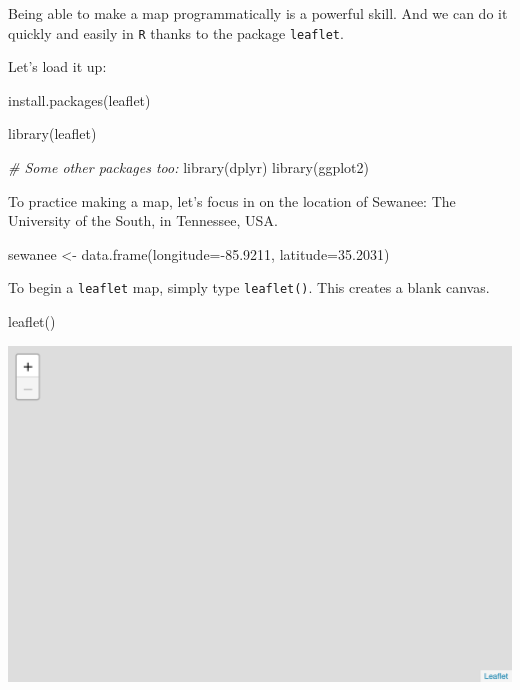 \documentclass[
]{book}
\newenvironment{Shaded}{\begin{snugshade}}{\end{snugshade}}
\newcommand{\AttributeTok}[1]{\textcolor[rgb]{0.77,0.63,0.00}{#1}}
\newcommand{\CommentTok}[1]{\textcolor[rgb]{0.56,0.35,0.01}{\textit{#1}}}
\newcommand{\FloatTok}[1]{\textcolor[rgb]{0.00,0.00,0.81}{#1}}
\newcommand{\FunctionTok}[1]{\textcolor[rgb]{0.00,0.00,0.00}{#1}}
\newcommand{\NormalTok}[1]{#1}
\newcommand{\OtherTok}[1]{\textcolor[rgb]{0.56,0.35,0.01}{#1}}
\newcommand{\SpecialCharTok}[1]{\textcolor[rgb]{0.00,0.00,0.00}{#1}}
\newcommand{\StringTok}[1]{\textcolor[rgb]{0.31,0.60,0.02}{#1}}
\begin{document}
Being able to make a map programmatically is a powerful skill. And we can do it quickly and easily in \texttt{R} thanks to the package \texttt{leaflet}.

Let's load it up:

\begin{Shaded}
\begin{Highlighting}[]
\FunctionTok{install.packages}\NormalTok{(}\StringTok{\textquotesingle{}leaflet\textquotesingle{}}\NormalTok{)}
\end{Highlighting}
\end{Shaded}

\begin{Shaded}
\begin{Highlighting}[]
\FunctionTok{library}\NormalTok{(leaflet)}

\CommentTok{\# Some other packages too:}
\FunctionTok{library}\NormalTok{(dplyr)}
\FunctionTok{library}\NormalTok{(ggplot2)}
\end{Highlighting}
\end{Shaded}

To practice making a map, let's focus in on the location of Sewanee: The University of the South, in Tennessee, USA.

\begin{Shaded}
\begin{Highlighting}[]
\NormalTok{sewanee }\OtherTok{\textless{}{-}} \FunctionTok{data.frame}\NormalTok{(}\AttributeTok{longitude=}\SpecialCharTok{{-}}\FloatTok{85.9211}\NormalTok{, }
                      \AttributeTok{latitude=}\FloatTok{35.2031}\NormalTok{)}
\end{Highlighting}
\end{Shaded}

To begin a \texttt{leaflet} map, simply type \texttt{leaflet()}. This creates a blank canvas.

\begin{Shaded}
\begin{Highlighting}[]
\FunctionTok{leaflet}\NormalTok{()}
\end{Highlighting}
\end{Shaded}

\includegraphics[width=694.08px]{figures/unnamed-chunk-221-1}
\end{document}
